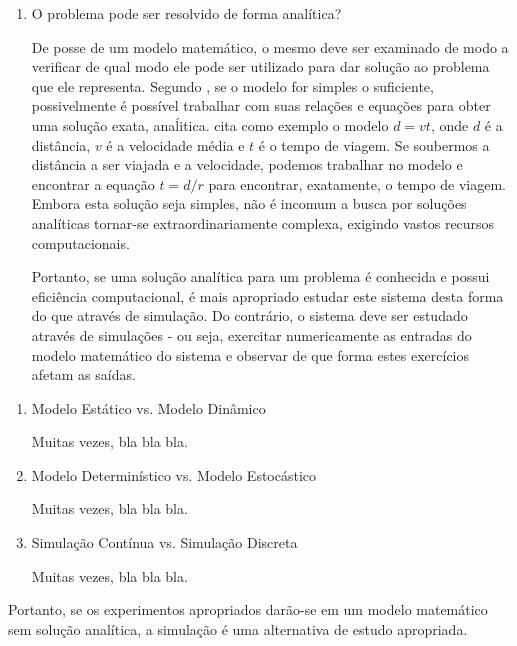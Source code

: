 \begin{enumerate}
\item O problema pode ser resolvido de forma analítica?

De posse de um modelo matemático, o mesmo deve ser examinado de modo a verificar de qual modo ele pode ser utilizado para dar solução ao problema que ele representa. Segundo \cite{Law}, se o modelo for simples o suficiente, possivelmente é possível trabalhar com suas relações e equações para obter uma solução exata, anaĺitica. \cite{Law} cita como exemplo o modelo $d = vt$, onde $d$ é a distância, $v$ é a velocidade média e $t$ é o tempo de viagem. Se soubermos a distância a ser viajada e a velocidade, podemos trabalhar no modelo e encontrar a equação $t = d/r$ para encontrar, exatamente, o tempo de viagem. Embora esta solução seja simples, não é incomum a busca por soluções analíticas tornar-se extraordinariamente complexa, exigindo vastos recursos computacionais.

Portanto, se uma solução analítica para um problema é conhecida e possui eficiência computacional, é mais apropriado estudar este sistema desta forma do que através de simulação. Do contrário, o sistema deve ser estudado através de simulações - ou seja, exercitar numericamente as entradas do modelo matemático do sistema e observar de que forma estes exercícios afetam as saídas.
\end{enumerate}

\begin{enumerate}
\item Modelo Estático vs. Modelo Dinâmico

Muitas vezes, bla bla bla.
\item Modelo Determinístico vs. Modelo Estocástico

Muitas vezes, bla bla bla.
\item Simulação Contínua vs. Simulação Discreta

Muitas vezes, bla bla bla.
\end{enumerate}

Portanto, se os experimentos apropriados darão-se em um modelo matemático sem solução analítica, a simulação é uma alternativa de estudo apropriada.